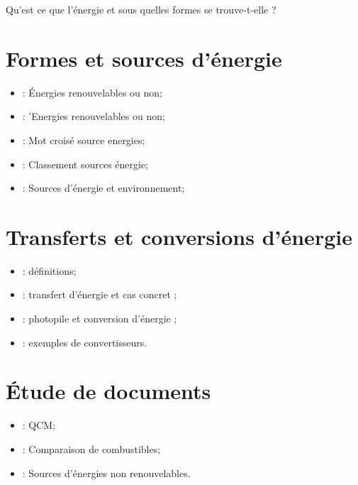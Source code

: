 \documentclass[12pt,a4paper]{article}
\date{}
\title{}
\begin{document}
	
	



\begin{mypb}
	\begin{center}
		{\Large Qu'est ce que l'énergie et sous quelles formes se trouve-t-elle ?}
	\end{center}
\end{mypb}


\section{Formes et sources d'énergie}








\begin{myexos}
	\begin{itemize}
		\item {} : \'Energies renouvelables ou non;
		\item {} : 'Energies renouvelables ou non;
		\item {} : Mot croisé source energies;
		\item {} : Classement sources énergie;
		\item {} : Sources d'énergie et environnement;
	\end{itemize}
\end{myexos}

\section{Transferts et conversions d'énergie}





\begin{myexos}
	\begin{itemize}
		\item {} : définitions;
		\item {} : transfert d'énergie et cas concret ; 
		\item {} : photopile et conversion d'énergie ;
		\item {} : exemples de convertisseurs.
	\end{itemize}
\end{myexos}

\section{Étude de documents}


\begin{myexos}
	\begin{itemize}
		\item {} : QCM;
		\item {} : Comparaison de combustibles;
		\item {} : Sources d'énergies non renouvelables.
		
	\end{itemize}
\end{myexos}

\appendix

\end{document}
